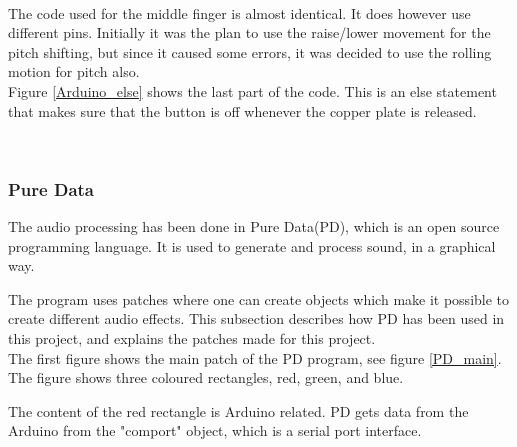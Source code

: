 \begin{minipage}{\linewidth}%
\label{index_finger}
\end{minipage}\\

The code used for the middle finger is almost identical. It does however use different pins. Initially it was the plan to use the raise/lower movement for the pitch shifting, but since it caused some errors, it was decided to use the rolling motion for pitch also.\\

Figure \ref{Arduino_else} shows the last part of the code. This is an else statement that makes sure that the button is off whenever the copper plate is released. 

\begin{minipage}{\linewidth}%
\label{Arduino_else}
\end{minipage}\\


\subsubsection{Pure Data}

The audio processing has been done in Pure Data(PD)\citep{PD_Info}, which is an open source programming language. It is used to generate and process sound, in a graphical way. 

The program uses patches where one can create objects which make it possible to create different audio effects. This subsection describes how PD has been used in this project, and explains the patches made for this project. \\

The first figure shows the main patch of the PD program, see figure \ref{PD_main}. The figure shows three coloured rectangles, red, green, and blue. 

The content of the red rectangle is Arduino related. PD gets data from the Arduino from the "comport" object, which is a serial port interface. 

